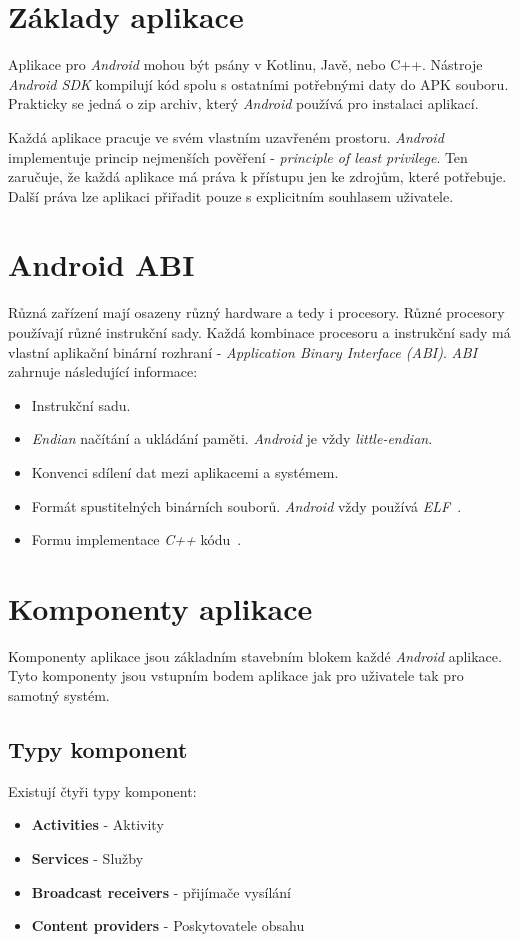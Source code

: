 \section{Základy aplikace}
Aplikace pro \emph{Android} mohou být psány v Kotlinu, Javě, nebo C++. Nástroje \emph{Android SDK} kompilují kód spolu s ostatními potřebnými daty do APK souboru. Prakticky se jedná o zip archiv, který \emph{Android} používá pro instalaci aplikací.

Každá aplikace pracuje ve svém vlastním uzavřeném prostoru. \emph{Android} implementuje princip nejmenších pověření - \emph{principle of least privilege}. Ten zaručuje, že každá aplikace má práva k přístupu jen ke zdrojům, které potřebuje. Další práva lze aplikaci přiřadit pouze s explicitním souhlasem uživatele.

\section{Android ABI}\label{sec:zaklady_abi}
Různá zařízení mají osazeny různý hardware a tedy i procesory. Různé procesory používají různé instrukční sady. Každá kombinace procesoru a instrukční sady má vlastní aplikační binární rozhraní - \emph{Application Binary Interface (ABI)}. \emph{ABI}~ zahrnuje následující informace:
\begin{itemize}
    \item Instrukční sadu.
    \item \emph{Endian} načítání a ukládání paměti. \emph{Android} je vždy \emph{little-endian}.
    \item Konvenci sdílení dat mezi aplikacemi a systémem.
    \item Formát spustitelných binárních souborů. \emph{Android} vždy používá \emph{ELF}~.
    \item Formu implementace \emph{C++} kódu~.
\end{itemize}

\section{Komponenty aplikace}
Komponenty aplikace jsou základním stavebním blokem každé \emph{Android} aplikace. Tyto komponenty jsou vstupním bodem aplikace jak pro uživatele tak pro samotný systém.

    \subsection{Typy komponent}
    Existují čtyři typy komponent:
    \begin{itemize}
        \item \textbf{Activities} - Aktivity
        \item \textbf{Services} - Služby
        \item \textbf{Broadcast receivers} - přijímače vysílání
        \item \textbf{Content providers} - Poskytovatele obsahu
    \end{itemize}

